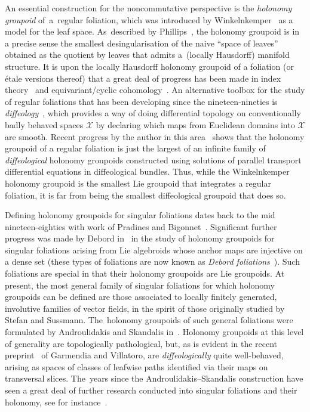 \documentclass[10pt,a4paper]{amsart}
\numberwithin{equation}{section}
\def\XX{{\mathcal{X}}}
\begin{document}
An essential construction for the noncommutative perspective is the \textit{holonomy groupoid} of~a~regular foliation, which was introduced by Winkelnkemper~\cite{wink} as a model for the leaf
space. As~described by Phillips~\cite{holimper}, the holonomy groupoid is in a precise sense the smallest desingularisation of the naive ``space of leaves'' obtained as the quotient by leaves that admits a~(locally Hausdorff) manifold structure. It is upon the locally Hausdorff holonomy groupoid of a foliation (or \'{e}tale versions thereof) that a great deal of progress has been made in index theory~\cite{ben6, ben3, ben4, ben7, ben2, ben5, pcr, cs, goro3, heitsch2, mac2, macr1, ms} and equivariant/cyclic cohomology~\cite{cyctrans,hopf1,diffcyc, backindgeom,crainic1,goro1,goro2,mac1,mosc1, moscorangi}. An alternative toolbox for the study of regular foliations that has been developing since the nineteen-nineties is \textit{diffeology}~\cite{hector, HMVSC}, which provides a way of doing differential topology on conventionally badly behaved spaces $\XX$ by declaring which maps from Euclidean domains into $\XX$ are smooth. Recent progress by the author in this area~\cite{mac3} shows that the holonomy groupoid of a regular foliation is just the largest of an infinite family of \textit{diffeological} holonomy groupoids constructed using solutions of parallel transport differential equations in diffeological bundles. Thus, while the Winkelnkemper holonomy groupoid is the smallest Lie groupoid that integrates a regular foliation, it is far from being the smallest diffeological groupoid that does so.

Defining holonomy groupoids for singular foliations dates back to the mid nineteen-eighties with work of Pradines and Bigonnet~\cite{pradines,pb}. Significant further progress was made by Debord in~\cite{debord, debord2} in the study of holonomy groupoids for singular foliations arising from Lie algebroids whose anchor maps are injective on a dense set (these types of foliations are now known as \textit{Debord foliations}~\cite[Definition~3.6]{lgls}). Such foliations are special in that their holonomy groupoids are Lie groupoids. At present, the most general family of singular foliations for which holonomy groupoids can be defined are those associated to locally finitely generated, involutive families of vector fields, in the spirit of those originally studied by Stefan and Sussmann. The~holonomy groupoids of such general foliations were formulated by Androulidakis and Skandalis in~\cite{iakovos2}. Holonomy groupoids at this level of generality are topologically pathological, but, as is evident in the recent preprint~\cite{VilGar1} of Garmendia and Villatoro, are \textit{diffeologically} quite well-behaved, arising as spaces of classes of leafwise paths identified via their maps on transversal slices. The~years since the Androulidakis--Skandalis construction have seen a great deal of further research conducted into singular foliations and their holonomy, see for instance~\cite{iakovos7,iakovos3,iakovos,iakovos4,ori1,GarZam,VilGar1}.
\end{document}
